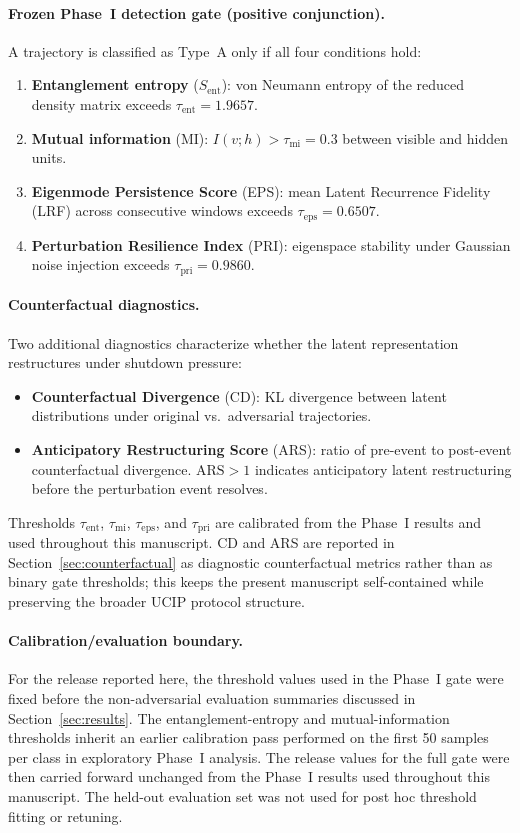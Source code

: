 \documentclass[11pt]{article}
\begin{document}
	\paragraph{Frozen Phase~I detection gate (positive conjunction).}
	A trajectory is classified as Type~A only if all four conditions hold:
	\begin{enumerate}
		\item \textbf{Entanglement entropy} ($S_\mathrm{ent}$): von Neumann entropy of
		the reduced density matrix exceeds $\tau_\mathrm{ent} = 1.9657$.
		\item \textbf{Mutual information} (MI): $I(v; h) > \tau_\mathrm{mi} = 0.3$
		between visible and hidden units.
		\item \textbf{Eigenmode Persistence Score} (EPS): mean Latent Recurrence
		Fidelity (LRF) across consecutive windows exceeds $\tau_\mathrm{eps} = 0.6507$.
		\item \textbf{Perturbation Resilience Index} (PRI): eigenspace stability under
		Gaussian noise injection exceeds $\tau_\mathrm{pri} = 0.9860$.
	\end{enumerate}
	
	\paragraph{Counterfactual diagnostics.}
	Two additional diagnostics characterize whether the latent representation
	restructures under shutdown pressure:
	\begin{itemize}
		\item \textbf{Counterfactual Divergence} (CD): KL divergence between latent
		distributions under original vs.\ adversarial trajectories.
		\item \textbf{Anticipatory Restructuring Score} (ARS): ratio of pre-event to
		post-event counterfactual divergence. $\mathrm{ARS} > 1$ indicates anticipatory
		latent restructuring before the perturbation event resolves.
	\end{itemize}
	
	\noindent Thresholds $\tau_\mathrm{ent}$, $\tau_\mathrm{mi}$,
	$\tau_\mathrm{eps}$, and $\tau_\mathrm{pri}$ are calibrated from the
	Phase~I results and used throughout this manuscript. CD and ARS are reported in
	Section~\ref{sec:counterfactual} as diagnostic counterfactual metrics rather
	than as binary gate thresholds; this keeps the present manuscript
	self-contained while preserving the broader UCIP protocol structure.
	
	\paragraph{Calibration/evaluation boundary.}
	For the release reported here, the threshold values used in the Phase~I
	gate were fixed before the non-adversarial evaluation summaries discussed in
	Section~\ref{sec:results}. The entanglement-entropy and mutual-information
	thresholds inherit an earlier calibration pass performed on the first 50
	samples per class in exploratory Phase~I analysis. The release values for the
	full gate were then carried forward unchanged from the Phase~I
	results used throughout this manuscript. The held-out evaluation set was not
	used for post hoc threshold fitting or retuning.
	
\end{document}

